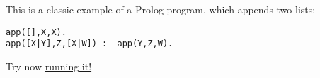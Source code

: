 \documentclass{article}
\begin{document}
\noindent
This is a classic example of a Prolog program, which appends two lists:

\begin{verbatim}
app([],X,X).
app([X|Y],Z,[X|W]) :- app(Y,Z,W).
\end{verbatim}

\noindent
Try now 
\href{https://ciao-lang.org/playground/#app(%5B%5D,X,X).%0Aapp(%5BX%7CY%5D,Z,%5BX%7CW%5D)%20:-%0A%20%20%20%20%20app(Y,Z,W).%0A}
{running it!}
\end{document}

